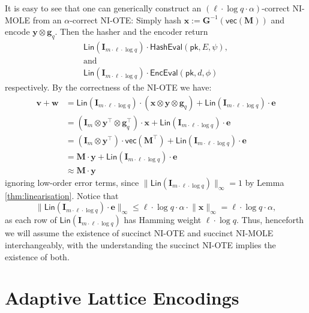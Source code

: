 \documentclass{theoretics}
\newcommand{\algofont}[1]{\ensuremath{\mathsf{#1}}}
\newcommand{\Enc}{{\algofont{Enc}}}
\newcommand{\Eval}{\algofont{Eval}\xspace}
\newcommand{\Hash}{{\algofont{Hash}}}
\newcommand{\id}{\ensuremath{\mathbf{I}}}
\newcommand{\pk}{{\mathsf{pk}}}
\newcommand{\seclab}[1]{\label{sec:#1}}
\begin{document}
It is easy to see that one can generically construct an $(\ell\cdot \log q\cdot \alpha)$-correct NI-MOLE from an $\alpha$-correct NI-OTE: Simply hash $\mathbf{x} := \mathbf{G}^{-1}(\mathsf{vec}(\mathbf{M}))$ and encode $\mathbf{y}\otimes \mathbf{g}_q$. Then the hasher and the encoder return
\begin{gather*}
\mathsf{Lin}(\id_{m\cdot \ell\cdot \log q})\cdot\Hash\Eval(\pk, E, \psi), \\
\text{and}
\\
\mathsf{Lin}(\id_{m\cdot \ell\cdot \log q})\cdot\Enc\Eval(\pk, d, \phi)
\end{gather*}
respectively. By the correctness of the NI-OTE we have:
\begin{align*}
\mathbf{v}+\mathbf{w}&=\mathsf{Lin}(\id_{m\cdot \ell\cdot \log q})\cdot (\mathbf{x}\otimes \mathbf{y}\otimes \mathbf{g}_q)+\mathsf{Lin}(\id_{m\cdot \ell\cdot \log q})\cdot \mathbf{e}\\
&=(\id_{m}\otimes \mathbf{y}^\intercal\otimes \mathbf{g}_q^\intercal)\cdot \mathbf{x}+\mathsf{Lin}(\id_{m\cdot \ell\cdot \log q})\cdot \mathbf{e}\\
&=(\id_{m}\otimes \mathbf{y}^\intercal)\cdot \mathsf{vec}(\mathbf{M}^\intercal)+\mathsf{Lin}(\id_{m\cdot \ell\cdot \log q})\cdot \mathbf{e}\\
&=\mathbf{M}\cdot \mathbf{y}+\mathsf{Lin}(\id_{m\cdot \ell\cdot \log q})\cdot \mathbf{e}\\
&\approx\mathbf{M}\cdot \mathbf{y}
\end{align*}
ignoring low-order error terms, since $\lVert \mathsf{Lin}(\id_{m\cdot \ell\cdot \log q}) \rVert_\infty=1$ by Lemma \ref{thm:linearisation}.  Notice that \[\lVert \mathsf{Lin}(\id_{m\cdot \ell\cdot \log q})\cdot \mathbf{e}\rVert_\infty\le \ell\cdot\log q\cdot \alpha\cdot \lVert \mathbf{x}\rVert_\infty=\ell\cdot \log q\cdot \alpha,\] 
{as each row of $\mathsf{Lin}(\id_{m\cdot \ell\cdot \log q})$ has Hamming weight $\ell \cdot \log q$.} Thus, henceforth we will assume the existence of succinct NI-OTE and succinct NI-MOLE interchangeably, with the understanding the succinct NI-OTE implies the existence of both.


\section{Adaptive Lattice Encodings}
\seclab{encodings}
\newcommand{\lenc}{\mathsf{LEnc}}
\end{document}

